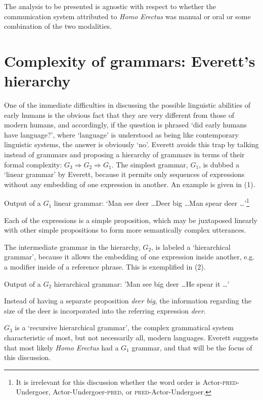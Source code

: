 \documentclass[output=paper,colorlinks,citecolor=brown]{langscibook}
\begin{document}
The analysis to be presented is agnostic with respect to whether the communication system attributed to \emph{Homo Erectus} was manual or oral or some combination of the two modalities.

\section{Complexity of grammars: Everett’s hierarchy}\label{sec:vanvalin:2}
One of the immediate difficulties in discussing the possible linguistic abilities of early humans is the obvious fact that they are very different from those of modern humans, and accordingly, if the question is phrased ‘did early humans have language?’, where ‘language’ is understood as being like contemporary linguistic systems, the answer is obviously ‘no’.  Everett avoids this trap by talking instead of grammars and proposing a hierarchy of grammars in terms of their formal complexity: $G_3 \Rightarrow G_2 \Rightarrow G_1$.  The simplest grammar, $G_1$, is dubbed a ‘linear grammar’ by Everett, because it permits only sequences of expressions without any embedding of one expression in another. An example is given in (1).

\ea
Output of a $G_1$ linear grammar: ‘Man see deer \ldots  Deer big \ldots  Man spear deer \ldots ’\footnote{It is irrelevant for this discussion whether the word order is Actor-\textsc{pred}-Undergoer, Actor-Undergoer-\textsc{pred}, or \textsc{pred}-Actor-Undergoer.}
\z

Each of the expressions is a simple proposition, which may be juxtaposed linearly with other simple propositions to form more semantically complex utterances.

The intermediate grammar in the hierarchy, $G_2$, is labeled a ‘hierarchical grammar’, because it allows the embedding of one expression inside another, e.g. a modifier inside of a reference phrase.  This is exemplified in (2).

\ea
Output of a $G_2$ hierarchical grammar: 'Man see big deer \ldots  He spear it \ldots ’
\z

Instead of having a separate proposition \emph{deer big}, the information regarding the size of the deer is incorporated into the referring expression \emph{deer}.

$G_3$ is a ‘recursive hierarchical grammar’, the complex grammatical system characteristic of most, but not necessarily all, modern languages.  Everett suggests that most likely \emph{Homo Erectus} had a $G_1$ grammar, and that will be the focus of this discussion.
\end{document}
